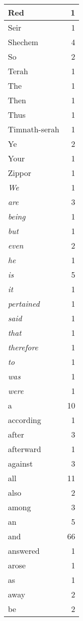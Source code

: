 \begin{center}
\begin{longtable}{l|r}
Red & 1\\ \hline 
Seir & 1\\ \hline 
Shechem & 4\\ \hline 
So & 2\\ \hline 
Terah & 1\\ \hline 
The & 1\\ \hline 
Then & 1\\ \hline 
Thus & 1\\ \hline 
Timnath-serah & 1\\ \hline 
Ye & 2\\ \hline 
Your & 1\\ \hline 
Zippor & 1\\ \hline 
\emph{We} & 1\\ \hline 
\emph{are} & 3\\ \hline 
\emph{being} & 1\\ \hline 
\emph{but} & 1\\ \hline 
\emph{even} & 2\\ \hline 
\emph{he} & 1\\ \hline 
\emph{is} & 5\\ \hline 
\emph{it} & 1\\ \hline 
\emph{pertained} & 1\\ \hline 
\emph{said} & 1\\ \hline 
\emph{that} & 1\\ \hline 
\emph{therefore} & 1\\ \hline 
\emph{to} & 1\\ \hline 
\emph{was} & 1\\ \hline 
\emph{were} & 1\\ \hline 
a & 10\\ \hline 
according & 1\\ \hline 
after & 3\\ \hline 
afterward & 1\\ \hline 
against & 3\\ \hline 
all & 11\\ \hline 
also & 2\\ \hline 
among & 3\\ \hline 
an & 5\\ \hline 
and & 66\\ \hline 
answered & 1\\ \hline 
arose & 1\\ \hline 
as & 1\\ \hline 
away & 2\\ \hline 
be & 2\\ \hline 

\end{longtable}
\end{center}

